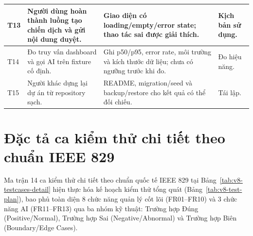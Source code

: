 \begin{table}[!htbp]
\begin{tabularx}{\textwidth}{|C{1.0cm}|L{3.6cm}|Y|L{2.6cm}|}
\hline
T13 & Người dùng hoàn thành luồng tạo chiến dịch và gửi nội dung duyệt. & Giao diện có loading/empty/error state; thao tác sai được giải thích. & Kịch bản sử dụng.\\
\hline
T14 & Đo truy vấn dashboard và gọi AI trên fixture cố định. & Ghi p50/p95, error rate, môi trường và kích thước dữ liệu; chưa có ngưỡng trước khi đo. & Đo hiệu năng.\\
\hline
T15 & Người khác dựng lại dự án từ repository sạch. & README, migration/seed và backup/restore cho kết quả có thể đối chiếu. & Tái lập.\\
\hline
\end{tabularx}
\end{table}

\clearpage

\section{Đặc tả ca kiểm thử chi tiết theo chuẩn IEEE 829}\label{sec:v8-ieee829-testcases}

Ma trận 14 ca kiểm thử chi tiết theo chuẩn quốc tế IEEE 829 tại Bảng~\ref{tab:v8-testcases-detail} hiện thực hóa kế hoạch kiểm thử tổng quát (Bảng~\ref{tab:v8-test-plan}), bao phủ toàn diện 8 chức năng quản lý cốt lõi (FR01--FR10) và 3 chức năng AI (FR11--FR13) qua ba nhóm kỹ thuật: Trường hợp Đúng (Positive/Normal), Trường hợp Sai (Negative/Abnormal) và Trường hợp Biên (Boundary/Edge Cases).

